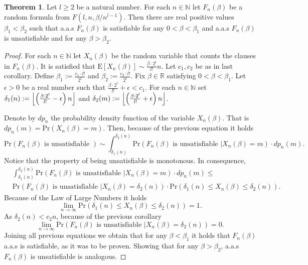 \documentclass[12pt,notitlepage,a4paper]{article}
\theoremstyle{definition}
\newtheorem{theorem}{Theorem}[section]
\newcommand{\R}{\mathbb{R}}
\newcommand{\N}{\mathbb{N}}
\newcommand{\Ln}{\lim\limits_{n\to \infty}}
\newcommand{\sep}{\noindent\rule{2cm}{0.4pt}}
\DeclarePairedDelimiter\floor{\lfloor}{\rfloor}
\begin{document}
\begin{theorem} \label{thm:phasetransition}
	Let $l\geq 2$ be a natural number.
	For each $n\in \N$ let $F_n(\beta)$ be a random formula from
	$F(l,n,\beta/n^{l-1})$. Then there are real positive values 
	$\beta_1 < \beta_2$ such that a.a.s $F_n(\beta)$ is satisfiable
	for any $0<\beta<\beta_1$ and a.a.s $F_n(\beta)$ is unsatisfiable
	and for any $\beta>\beta_2$.
\end{theorem}
\begin{proof}
	For each $n\in \N$ let $X_{n}(\beta)$ be the random variable
	that counts the clauses in $F_n(\beta)$. It is satisfied that
	$\mathrm{E}[X_n(\beta)]\sim \frac{\beta\cdot 2^l}{l!}n$. Let $c_1,
	c_2$ be as in last corollary. Define $\beta_1:= \frac{c_1\cdot l!}{2^l}$
	and $\beta_2:= \frac{c_2 \cdot l!}{2^l}$. Fix $\beta\in \R$ satisfying
	$0<\beta<\beta_1$. Let $\epsilon>0$ be a real number such that
	$ \frac{\beta\cdot 2^l}{l!} +\epsilon< c_1$. For each $n\in \N$
	set $\delta_1(n):=\floor*{ \left(\frac{\beta\cdot 2^l}{l!}-\epsilon\right)n}$
	and $\delta_2(m):=\floor*{ \left(\frac{\beta\cdot 2^l}{l!}+\epsilon\right)n}$.

	Denote by $dp_n$ the probability density function of the variable $X_n(\beta)$.
	That is $dp_n(m)=\mathrm{Pr}(X_n(\beta)=m)$. Then, because of the previous equation it holds
	\[
	\mathrm{Pr}\left( F_n(\beta) \text{ is unsatisfiable }\right)\sim
	\int_{\delta_1(n)}^{\delta_2(n)}
 \mathrm{Pr} \left(
	F_n(\beta) \text{ is unsatisfiable } \Big|
	X_n(\beta)=m	
	\right)\cdot dp_n(m).
	\]
	Notice that the property of being unsatisfiable is monotonous.
	In consequence,
	\begin{align*}
	&\int_{\delta_1(n)}^{\delta_2(n)}
	\mathrm{Pr} \left(
	F_n(\beta) \text{ is unsatisfiable } \Big|
	X_n(\beta)=m	
	\right)\cdot dp_n(m)\leq \\ & 
	\mathrm{Pr} \left(
	F_n(\beta) \text{ is unsatisfiable } \Big|
	X_n(\beta)=\delta_2(n) \right) \cdot 
	\mathrm{Pr}\left( \delta_1(n) \leq X_n(\beta)  
	\leq \delta_2(n)  \right).   
	\end{align*}
	Because of the Law of Large Numbers it holds
	\begin{equation*}
	\Ln \mathrm{Pr}\left( \delta_1(n) \leq X_n(\beta)  
	\leq \delta_2(n) \right) = 1.
	\end{equation*}
	As $\delta_2(n)< c_2n$, because of the previous
	corollary
	\[
	\Ln \mathrm{Pr} \left(
	F_n(\beta) \text{ is unsatisfiable } \Big|
	X_n(\beta)=\delta_2(n) \right)= 0.
	\]  
	Joining all previous equations we obtain that for any 
	$\beta < \beta_1$ it holds that
	$F_n(\beta)$ a.a.s is satisfiable, as it was to be proven.
	Showing that for any $\beta > \beta_2$, 
	a.a.s $F_n(\beta)$ is unsatisfiable is analogous.
\end{proof}
\end{document}
